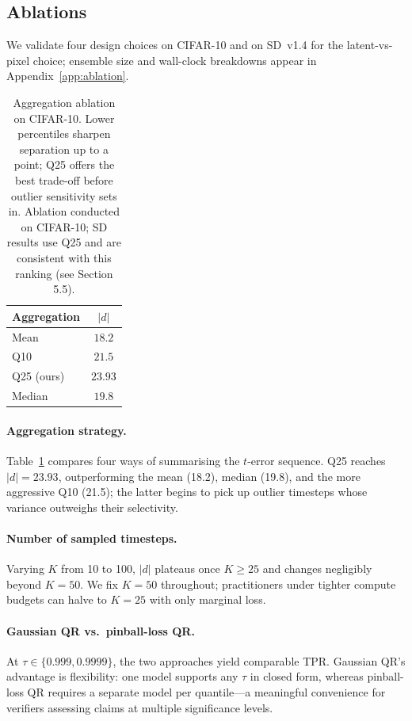 \documentclass{article}
\begin{document}
\subsection{Ablations}
\label{sec:ablation}

We validate four design choices on CIFAR-10 and on SD~v1.4 for 
the latent-vs-pixel choice; ensemble size and wall-clock 
breakdowns appear in Appendix~\ref{app:ablation}.

\begin{table}[t]
\caption{Aggregation ablation on CIFAR-10.  Lower percentiles
sharpen separation up to a point; Q25 offers the best trade-off
before outlier sensitivity sets in.
Ablation conducted on CIFAR-10; SD results use Q25 and are consistent with this ranking (see Section 5.5).}
\label{tab:aggregation}
\centering
\begin{small}
\begin{tabular}{lc}
\toprule
Aggregation & $|d|$ \\
\midrule
Mean & $18.2$ \\
Q10 & $21.5$ \\
Q25 (ours) & $\mathbf{23.93}$ \\
Median & $19.8$ \\
\bottomrule
\end{tabular}
\end{small}
\end{table}

\paragraph{Aggregation strategy.}
Table~\ref{tab:aggregation} compares four ways of summarising the 
$t$-error sequence. Q25 reaches $|d| = 23.93$, outperforming the 
mean (18.2), median (19.8), and the more aggressive Q10 (21.5); 
the latter begins to pick up outlier timesteps whose variance 
outweighs their selectivity.

\paragraph{Number of sampled timesteps.}
Varying $K$ from 10 to 100, $|d|$ plateaus once $K \geq 25$ and 
changes negligibly beyond $K = 50$. We fix $K = 50$ throughout; 
practitioners under tighter compute budgets can halve to $K = 25$ 
with only marginal loss.

\paragraph{Gaussian QR vs.\ pinball-loss QR.}
At $\tau \in \{0.999, 0.9999\}$, the two approaches yield 
comparable TPR. Gaussian QR's advantage is flexibility: one model 
supports any $\tau$ in closed form, whereas pinball-loss QR 
requires a separate model per quantile---a meaningful convenience 
for verifiers assessing claims at multiple significance levels.
\end{document}
